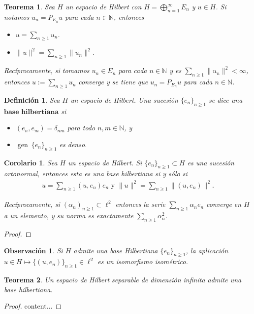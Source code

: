 \documentclass[11pt]{report}
\theoremstyle{colored}
\newtheorem{definition}{Definición}[section]
\newtheorem{theorem}{Teorema}[section]
\newtheorem{corollary}{Corolario}[section]
\newtheorem{remark}{Observación}[section]
\newcommand{\N}{\mathbb{N}}
\newcommand{\ip}[1]{( #1 )}
\newcommand{\paint}[1]{\color{color}{#1}}
\begin{document}
\begin{theorem} Sea $H$ un espacio de Hilbert con $H = \bigoplus_{n = 1}^\infty E_n$ y $u \in H$. Si notamos $u_n = P_{E_n}u$ para cada $n \in \N$, entonces
\begin{itemize}
\item[(i)] $u = \sum_{n \geq 1}u_n$.
\item[(ii)] $\|u\|^2 = \sum_{n \geq 1}\|u_n\|^2$.
\end{itemize}

Recíprocamente, si tomamos $u_n \in E_n$ para cada $n \in \N$ y es $\sum_{n \geq 1}\|u_n\|^2 < \infty$, entonces $u := \sum_{n \geq 1}u_n$ converge y se tiene que $u_n = P_{E_n}u$ para cada $n \in \N$.
\end{theorem}

\begin{definition} Sea $H$ un espacio de Hilbert. Una sucesión $\{e_n\}_{n \geq 1}$ se dice una $\textbf{base hilbertiana}$ si
\begin{itemize}
\item[$\paint{\bullet}$] $\ip{e_n,e_m} = \delta_{nm}$ para todo $n,m \in \N$, y
\item[$\paint{\bullet}$] $\operatorname{gen} \ \{e_n\}_{n \geq 1}$ es denso.
\end{itemize}
\end{definition}

\begin{corollary} Sea $H$ un espacio de Hilbert. Si $\{e_n\}_{n \geq 1} \subset H$ es una sucesión ortonormal, entonces esta es una base hilbertiana si y sólo si 
\begin{align*}
u = \sum_{n \geq 1}(u,e_n)e_n \text{ y } \|u\|^2 = \sum_{n \geq 1}\|(u,e_n)\|^2.
\end{align*}

Recíprocamente, si $(\alpha_n)_{n \geq 1} \subset \ell^2$ entonces la serie $\sum_{n \geq 1}\alpha_n e_n$ converge en $H$ a un elemento, y su norma es exactamente $\sum_{n \geq 1}\alpha_n^2$.
\end{corollary}
\begin{proof}
\end{proof}

\begin{remark} Si $H$ admite una base Hilbertiana $\{e_n\}_{n \geq 1}$, la aplicación $u \in H \mapsto \{(u,e_n)\}_{n \geq 1} \in \ell^2$ es un isomorfismo isométrico.
\end{remark}

\begin{theorem} Un espacio de Hilbert separable de dimensión infinita admite una base hilbertiana.
\end{theorem}
\begin{proof}
content...
\end{proof}
\end{document}

